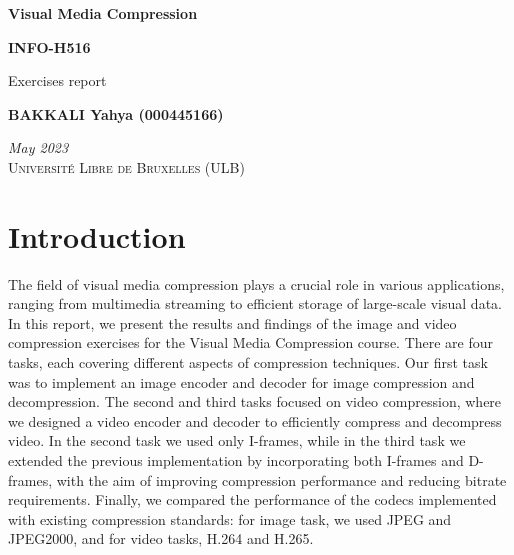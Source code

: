 \documentclass{article}
\begin{document}
\begin{titlepage}
    \begin{center}
        \BgThispage
        \vspace*{1cm}
        
        
        \huge
        \textbf{Visual Media Compression}
        \vspace{0.25cm}
        
        \LARGE
        \textbf{INFO-H516}
        
        \vspace{0.5cm}
        \LARGE
        {Exercises report}
        
        \vspace{3.5cm}
        
        \textbf{BAKKALI Yahya (000445166) \\}


        \vspace{2.5cm}
        \textit{May 2023 \\}
        \vspace{0.5cm}
        \textsc{Université Libre de Bruxelles (ULB)}
        
        
    \end{center}
\end{titlepage}

\tableofcontents
\thispagestyle{empty}
\newpage
\setcounter{page}{1}
\setlength{\parskip}{1em}

\section{Introduction}

The field of visual media compression plays a crucial role in various applications, ranging from multimedia streaming to efficient storage of large-scale visual data. In this report, we present the results and findings of the image and video compression exercises for the Visual Media Compression course. There are four tasks, each covering different aspects of compression techniques. Our first task was to implement an image encoder and decoder for image compression and decompression. The second and third tasks focused on video compression, where we designed a video encoder and decoder to efficiently compress and decompress video. In the second task we used only I-frames, while in the third task we extended the previous implementation by incorporating both I-frames and D-frames, with the aim of improving compression performance and reducing bitrate requirements. Finally, we compared the performance of the codecs implemented with existing compression standards: for image task, we used JPEG and JPEG2000, and for video tasks, H.264 and H.265.
\end{document}
